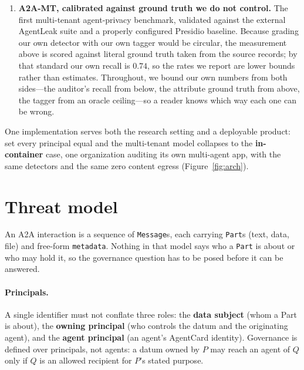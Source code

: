 \documentclass[conference,compsoc]{IEEEtran}
\begin{document}
\begin{enumerate}
agent principal---and carries them in \texttt{Part.metadata}. It composes with
unmodified A2A, and it is the mechanism the two results above stand on: without it
there is nothing for a content-blind center to reason over.
\item \textbf{A2A-MT, calibrated against ground truth we do not control.} The first
multi-tenant agent-privacy benchmark, validated against the external AgentLeak suite
and a properly configured Presidio baseline. Because grading our own detector with our
own tagger would be circular, the measurement above is scored against literal ground
truth taken from the source records; by that standard our own recall is $0.74$, so the
rates we report are lower bounds rather than estimates. Throughout, we bound our own
numbers from both sides---the auditor's recall from below, the attribute ground
truth from above, the tagger from an oracle ceiling---so a reader knows which way
each one can be wrong.
\end{enumerate}
\noindent One implementation serves both the research setting and a deployable
product: set every principal equal and the multi-tenant model collapses to the
\textbf{in-container} case, one organization auditing its own multi-agent app,
with the same detectors and the same zero content egress (Figure~\ref{fig:arch}).



\section{Threat model}\label{sec:threat}
An A2A interaction is a sequence of \texttt{Message}s, each carrying
\texttt{Part}s (text, data, file) and free-form \texttt{metadata}. Nothing in that
model says who a \texttt{Part} is about or who may hold it, so the governance
question has to be posed before it can be answered.

\paragraph{Principals.} A single identifier must not conflate three roles: the
\textbf{data subject} (whom a Part is about), the \textbf{owning principal} (who
controls the datum and the originating agent), and the \textbf{agent principal} (an
agent's AgentCard identity). Governance is defined over principals, not agents: a
datum owned by $P$ may reach an agent of $Q$ only if $Q$ is an allowed recipient for
$P$'s stated purpose.
\end{document}
